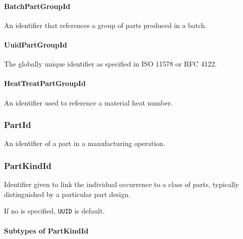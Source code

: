 \paragraph{BatchPartGroupId}\mbox{}
\label{sec:BatchPartGroupId}


An identifier that references a group of parts produced in a batch.


\paragraph{UuidPartGroupId}\mbox{}
\label{sec:UuidPartGroupId}


The globally unique identifier as specified in ISO 11578 or RFC 4122.


\paragraph{HeatTreatPartGroupId}\mbox{}
\label{sec:HeatTreatPartGroupId}


An identifier used to reference a material heat number.


\subsubsection{PartId}
\label{sec:PartId}



An identifier of a part in a manufacturing operation.


\subsubsection{PartKindId}
\label{sec:PartKindId}



Identifier given to link the individual occurrence to a class of parts, typically distinguished by a particular part design. 

If no  is specified, \texttt{UUID} is default.



\paragraph{Subtypes of PartKindId}\mbox{}
\label{sec:Subtypes of PartKindId}

